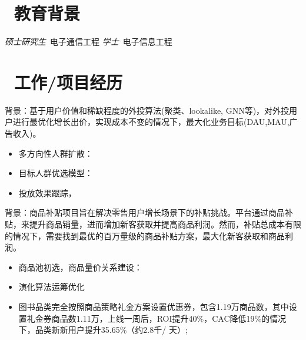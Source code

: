 \documentclass{resume}
\begin{document}

 
\section{\faGraduationCap\  教育背景}
\textit{硕士研究生}\ 电子通信工程
\textit{学士}\ 电子信息工程

\section{\faUsers\ 工作/项目经历}


\begin{onehalfspacing}
 背景：基于用户价值和稀缺程度的外投算法(聚类、lookalike, GNN等)，对外投用户进行最优化增长出价，实现成本不变的情况下，最大化业务目标(DAU,MAU,广告收入)。
\begin{itemize}
  \item 多方向性人群扩散：
  \item 目标人群优选模型：
  \item 投放效果跟踪，
\end{itemize}
\end{onehalfspacing}

\begin{onehalfspacing}
背景：商品补贴项目旨在解决零售用户增长场景下的补贴挑战。平台通过商品补贴，来提升商品销量，进而增加新客获取并提高商品利润。然而，补贴总成本有限的情况下，需要找到最优的百万量级的商品补贴方案，最大化新客获取和商品利润。
\begin{itemize}
  \item 商品池初选，商品量价关系建设：
  \item 演化算法运筹优化
  \item 图书品类完全按照商品策略礼金方案设置优惠券，包含1.19万商品数，其中设置礼金券商品数1.11万，上线一周后，ROI提升40\%，CAC降低19\%的情况下，品类新新用户提升35.65\%（约2.8千/ 天）;
\end{itemize}
\end{onehalfspacing}
\end{document}

